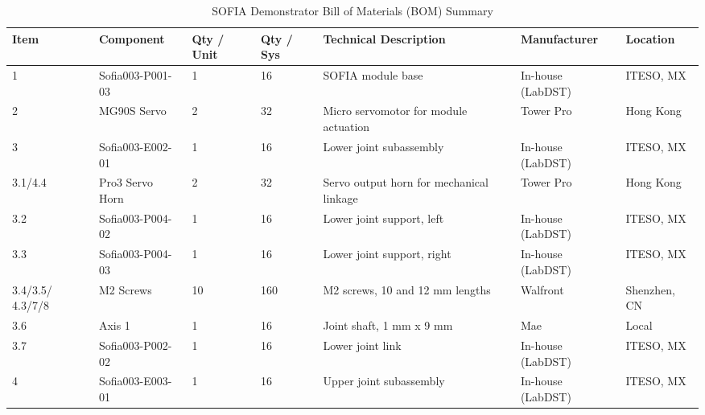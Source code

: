 \documentclass[lettersize,journal]{IEEEtran}
\begin{document}
	\begin{table}[!t]
		\centering
		\caption{SOFIA Demonstrator Bill of Materials (BOM) Summary}
		\label{tab:bom}
		\tiny
		
		\setlength{\tabcolsep}{1.5pt}
		\renewcommand{\arraystretch}{1.05}
		
		\begin{tabularx}{\columnwidth}{@{}P{0.8cm} P{2.0cm} P{0.5cm} P{0.5cm} P{2.4cm} P{1.1cm} P{0.8cm}@{}}
			
			\toprule
			\textbf{Item} &
			\textbf{Component} &
			\textbf{Qty / Unit} &
			\textbf{Qty / Sys} &
			\textbf{Technical Description} &
			\textbf{Manufacturer} &
			\textbf{Location} \\
			\midrule
			
			1 & Sofia003-P001-03 & 1 & 16 &
			SOFIA module base &
			In-house (LabDST) & ITESO, MX \\
			
			2 & MG90S Servo & 2 & 32 &
			Micro servomotor for module actuation &
			Tower Pro & Hong Kong \\
			
			3 & Sofia003-E002-01 & 1 & 16 &
			Lower joint subassembly &
			In-house (LabDST) & ITESO, MX \\
			
			3.1/4.4 & Pro3 Servo Horn & 2 & 32 &
			Servo output horn for mechanical linkage &
			Tower Pro & Hong Kong \\
			
			3.2 & Sofia003-P004-02 & 1 & 16 &
			Lower joint support, left &
			In-house (LabDST) & ITESO, MX \\
			
			3.3 & Sofia003-P004-03 & 1 & 16 &
			Lower joint support, right &
			In-house (LabDST) & ITESO, MX \\
			
			3.4/3.5/
			4.3/7/8 & M2 Screws & 10 & 160 &
			M2 screws, 10 and 12 mm lengths &
			Walfront & Shenzhen, CN \\
			
			3.6 & Axis 1 & 1 & 16 &
			Joint shaft, 1 mm x 9 mm &
			Mae & Local \\
			
			3.7 & Sofia003-P002-02 & 1 & 16 &
			Lower joint link &
			In-house (LabDST) & ITESO, MX \\
			
			4 & Sofia003-E003-01 & 1 & 16 &
			Upper joint subassembly &
			In-house (LabDST) & ITESO, MX \\
			

\end{tabularx}
\end{table}
\end{document}
